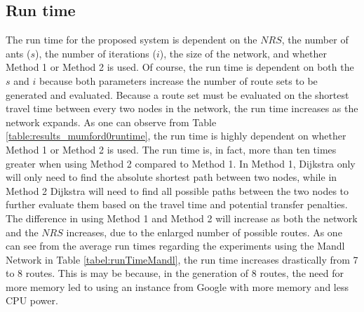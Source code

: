 \subsection{Run time}
\label{subsec:runtime}

The run time for the proposed system is dependent on the $NRS$, the number of ants ($s$), the number of iterations ($i$), the size of the network, and whether Method 1 or Method 2 is used.  Of course, the run time is dependent on both the $s$ and $i$ because both parameters increase the number of route sets to be generated and evaluated. Because a route set must be evaluated on the shortest travel time between every two nodes in the network, the run time increases as the network expands. As one can observe from Table \vref{table:results_mumford0runtime}, the run time is highly dependent on whether Method 1 or Method 2 is used. The run time is, in fact, more than ten times greater when using Method 2 compared to Method 1. In Method 1, Dijkstra only will only need to find the absolute shortest path between two nodes, while in Method 2 Dijkstra will need to find all possible paths between the two nodes to further evaluate them based on the travel time and potential transfer penalties. The difference in using Method 1 and Method 2 will increase as both the network and the $NRS$ increases, due to the enlarged number of possible routes. As one can see from the average run times regarding the experiments using the Mandl Network in Table \vref{tabel:runTimeMandl}, the run time increases drastically from 7 to 8 routes. This is may be because, in the generation of 8 routes, the need for more memory led to using an instance from Google with more memory and less CPU power. 
 




